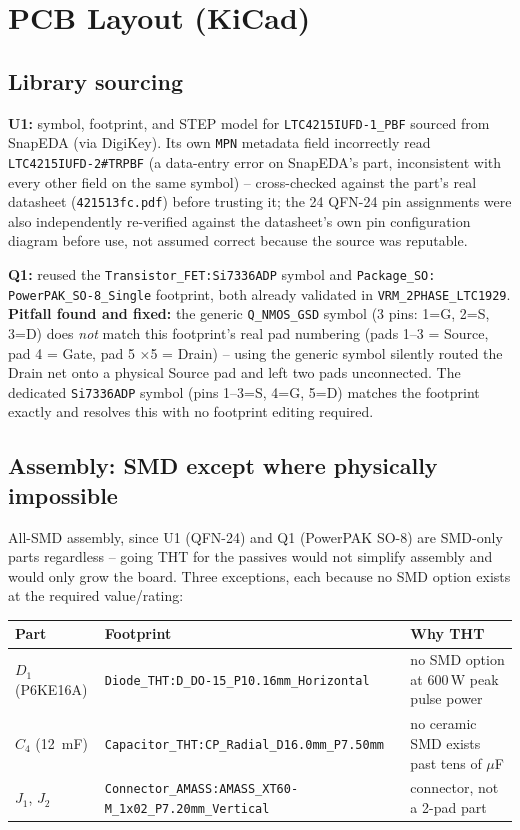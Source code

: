 \documentclass[11pt,letterpaper]{article}
\begin{document}
\section{PCB Layout (KiCad)}
\label{sec:pcb}

\subsection{Library sourcing}

\textbf{U1:} symbol, footprint, and STEP model for \texttt{LTC4215IUFD-1\_PBF} sourced from SnapEDA (via
DigiKey). Its own \texttt{MPN} metadata field incorrectly read \texttt{LTC4215IUFD-2\#TRPBF} (a data-entry
error on SnapEDA's part, inconsistent with every other field on the same symbol) -- cross-checked against
the part's real datasheet (\texttt{421513fc.pdf}) before trusting it; the 24 QFN-24 pin assignments were
also independently re-verified against the datasheet's own pin configuration diagram before use, not
assumed correct because the source was reputable.

\textbf{Q1:} reused the \texttt{Transistor\_FET:Si7336ADP} symbol and \texttt{Package\_SO:
PowerPAK\_SO-8\_Single} footprint, both already validated in \texttt{VRM\_2PHASE\_LTC1929}.
\textbf{Pitfall found and fixed:} the generic \texttt{Q\_NMOS\_GSD} symbol (3 pins: 1=G, 2=S, 3=D) does
\emph{not} match this footprint's real pad numbering (pads 1--3 = Source, pad 4 = Gate, pad 5 $\times$5 =
Drain) -- using the generic symbol silently routed the Drain net onto a physical Source pad and left two
pads unconnected. The dedicated \texttt{Si7336ADP} symbol (pins 1--3=S, 4=G, 5=D) matches the footprint
exactly and resolves this with no footprint editing required.

\subsection{Assembly: SMD except where physically impossible}

All-SMD assembly, since U1 (QFN-24) and Q1 (PowerPAK SO-8) are SMD-only parts regardless -- going THT for
the passives would not simplify assembly and would only grow the board. Three exceptions, each because no
SMD option exists at the required value/rating:

\begin{center}
\begin{tabular}{@{}lll@{}}
\toprule
\textbf{Part} & \textbf{Footprint} & \textbf{Why THT} \\
\midrule
$D_1$ (P6KE16A) & \texttt{Diode\_THT:D\_DO-15\_P10.16mm\_Horizontal} & no SMD option at 600\,W peak pulse power \\
$C_4$ (\SI{12}{\milli\farad}) & \texttt{Capacitor\_THT:CP\_Radial\_D16.0mm\_P7.50mm} & no ceramic SMD exists past tens of $\mu$F \\
$J_1$, $J_2$ & \texttt{Connector\_AMASS:AMASS\_XT60-M\_1x02\_P7.20mm\_Vertical} & connector, not a 2-pad part \\
\bottomrule
\end{tabular}
\end{center}
\end{document}

